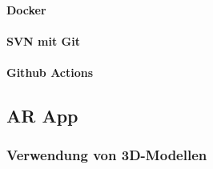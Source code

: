\documentclass[titlepage, a4paper, 11pt]{scrartcl}
\begin{document}
        \paragraph{Docker}

        \paragraph{SVN mit Git}

        \paragraph{Github Actions}


    \subsection{AR App}

    \subsubsection{Verwendung von 3D-Modellen}
    
\end{document}
